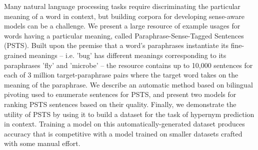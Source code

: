 Many natural language processing tasks require discriminating the particular meaning of a word in context, but building corpora for developing sense-aware models can be a challenge. We present a large resource of example usages for words having a particular meaning, called Paraphrase-Sense-Tagged Sentences (PSTS). Built upon the premise that a word's paraphrases instantiate its fine-grained meanings -- i.e. 'bug' has different meanings corresponding to its paraphrases 'fly' and 'microbe' -- the resource contains up to 10,000 sentences for each of 3 million target-paraphrase pairs where the target word takes on the meaning of the paraphrase. We describe an automatic method based on bilingual pivoting used to enumerate sentences for PSTS, and present two models for ranking PSTS sentences based on their quality. Finally, we demonstrate the utility of PSTS by using it to build a dataset for the task of hypernym prediction in context. Training a model on this automatically-generated dataset produces accuracy that is competitive with a model trained on smaller datasets crafted with some manual effort.